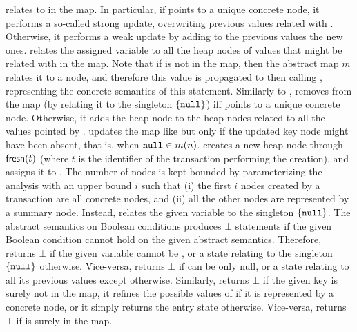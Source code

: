  relates  to  in the map. In particular, if  points to a unique concrete node, it performs a so-called strong update, overwriting previous values related with . Otherwise, it performs a weak update by adding to the previous values the new ones.  relates the assigned variable  to all the heap nodes of values that might be related with  in the map. Note that if  is not in the map, then the abstract map $m$ relates it to a  node, and therefore this value is propagated to  then calling , representing the concrete semantics of this statement. Similarly to ,  removes  from the map (by relating it to the singleton $\{\mathtt{null}\}$) iff  points to a unique concrete node. Otherwise, it adds the heap node  to the heap nodes related to all the values pointed by .  updates the map like  but only if the updated key node might have been absent, that is, when $\mathtt{null} \in m(n)$.  creates a new heap node through $\mathsf{fresh}(t)$ (where $t$ is the identifier of the transaction performing the creation), and assigns it to . The number of nodes is kept bounded by parameterizing the analysis with an upper bound $i$ such that (i) the first $i$ nodes created by a transaction are all concrete nodes, and (ii) all the other nodes are represented by a summary node. Instead,  relates the given variable to the singleton $\{\mathtt{null}\}$.
The abstract semantics on Boolean conditions produces $\bot$ statements if the given Boolean condition cannot hold on the given abstract semantics. Therefore,  returns $\bot$ if the given variable  cannot be , or a state relating  to the singleton $\{\mathtt{null}\}$ otherwise. Vice-versa,  returns $\bot$ if  can be only null, or a state relating  to all its previous values except  otherwise.
Similarly,  returns $\bot$ if the given key  is surely not in the map, it refines the possible values of  if it is represented by a concrete node, or it simply returns the entry state otherwise. Vice-versa,  returns $\bot$ if  is surely in the map.

